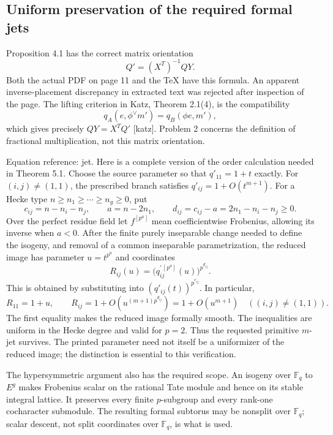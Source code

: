 \documentclass[10pt]{article}
\begin{document}
\subsection*{Uniform preservation of the required formal jets}
Proposition 4.1 has the correct matrix orientation \[Q'=(X^{T})^{-1}QY.\] Both the actual PDF on page 11 and the TeX have this formula. An apparent inverse-placement discrepancy in extracted text was rejected after inspection of the page. The lifting criterion in Katz, Theorem 2.1(4), is the compatibility \[q_A(e,\phi^\vee m')=q_B(\phi e,m'),\] which gives precisely \(QY=X^TQ'\) [katz]. Problem 2 concerns the definition of fractional multiplication, not this matrix orientation.\par
Equation reference: jet. Here is a complete version of the order calculation needed in Theorem 5.1. Choose the source parameter so that \(q'_{11}=1+t\) exactly. For \((i,j)\ne(1,1)\), the prescribed branch satisfies \(q'_{ij}=1+O(t^{m+1})\). For a Hecke type \(n\geq n_1\geq\cdots\geq n_g\geq0\), put \[c_{ij}=n-n_i-n_j,\qquad a=n-2n_1,\qquad
 d_{ij}=c_{ij}-a=2n_1-n_i-n_j\geq0.\] Over the perfect residue field let \(f^{[p^a]}\) mean coefficientwise Frobenius, allowing its inverse when \(a<0\). After the finite purely inseparable change needed to define the isogeny, and removal of a common inseparable parametrization, the reduced image has parameter \(u=t^{p^a}\) and coordinates \[
 R_{ij}(u)=\bigl(q_{ij}^{\prime\,[p^a]}(u)\bigr)^{p^{d_{ij}}}.\] This is obtained by substituting into \((q'_{ij}(t))^{p^{c_{ij}}}\). In particular, \[R_{11}=1+u,\qquad
 R_{ij}=1+O(u^{(m+1)p^{d_{ij}}})=1+O(u^{m+1})
 \quad ((i,j)\ne(1,1)).\] The first equality makes the reduced image formally smooth. The inequalities are uniform in the Hecke degree and valid for \(p=2\). Thus the requested primitive \(m\)-jet survives. The printed parameter need not itself be a uniformizer of the reduced image; the distinction is essential to this verification.\par
The hypersymmetric argument also has the required scope. An isogeny over \(\mathbb F_q\) to \(E^g\) makes Frobenius scalar on the rational Tate module and hence on its stable integral lattice. It preserves every finite \(p\)-subgroup and every rank-one cocharacter submodule. The resulting formal subtorus may be nonsplit over \(\mathbb F_q\); scalar descent, not split coordinates over \(\mathbb F_q\), is what is used.\par
\end{document}
